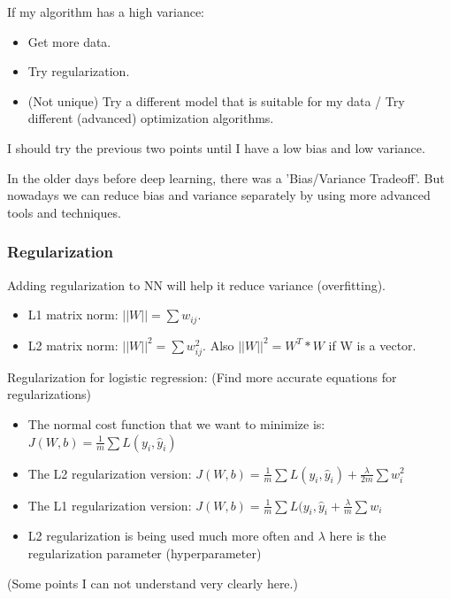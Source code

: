 If my algorithm has a high variance:
\begin{itemize}
    \item Get more data.
    \item Try regularization.
    \item (Not unique) Try a different model that is suitable for my data / Try different (advanced) optimization algorithms.
\end{itemize}

I should try the previous two points until I have a low bias and low variance.

In the older days before deep learning, there was a 'Bias/Variance Tradeoff'. But nowadays we can reduce bias and variance separately by using more advanced tools and techniques.

\subsubsection{Regularization}
Adding regularization to NN will help it reduce variance (overfitting).

\begin{itemize}
    \item L1 matrix norm: $||W|| = \sum w_{ij}$.

    \item L2 matrix norm: $||W||^2 = \sum w_{ij}^2$. Also $||W||^2 = W^T * W $ if W is a vector.
\end{itemize}

Regularization for logistic regression: (Find more accurate equations for regularizations)
\begin{itemize}
    \item The normal cost function that we want to minimize is: $J(W, b) = \frac{1}{m} \sum L(y_i, \hat{y}_i)$
    \item The L2 regularization version: $J(W,b) = \frac{1}{m} \sum L(y_i, \hat{y}_i) + \frac{\lambda}{2m} \sum w_i^2$
    \item The L1 regularization version: $J(W,b) = \frac{1}{m} \sum L(y_i, \hat{y}_i + \frac{\lambda}{m} \sum w_i$
    \item L2 regularization is being used much more often and $\lambda$ here is the regularization parameter (hyperparameter)
\end{itemize}

(Some points I can not understand very clearly here.)

